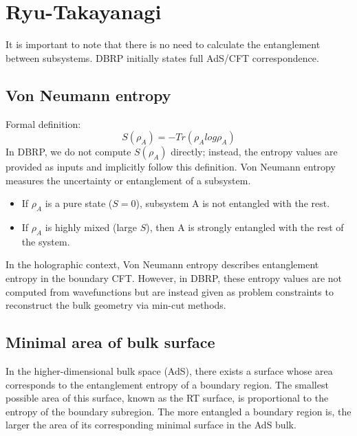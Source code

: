 \documentclass[12pt]{article}
\begin{document}
\section{Ryu-Takayanagi}
        \hspace{.5cm} It is important to note that there is no need to calculate the entanglement between subsystems. DBRP initially states full AdS/CFT correspondence.

    \subsection{Von Neumann entropy}
        Formal definition:
        \[
            S(\rho_A) = -Tr(\rho_{A}log\rho_A)
        \]
        \hspace{0.5cm} In DBRP, we do not compute $S(\rho_A)$ directly; instead, the entropy values are provided as inputs and implicitly follow this definition. Von Neumann entropy measures the uncertainty or entanglement of a subsystem.
        \begin{itemize}
            \item If $\rho_A$ is a pure state ($S=0$), subsystem A is not entangled with the rest.
            \item If $\rho_A$ is highly mixed (large $S$), then A is strongly entangled with the rest of the system.
        \end{itemize}

        In the holographic context, Von Neumann entropy describes entanglement entropy in the boundary CFT. However, in DBRP, these entropy values are not computed from wavefunctions but are instead given as problem constraints to reconstruct the bulk geometry via min-cut methods.
    
    \subsection{Minimal area of bulk surface}
        \hspace{0.5cm} In the higher-dimensional bulk space (AdS), there exists a surface whose area corresponds to the entanglement entropy of a boundary region. The smallest possible area of this surface, known as the RT surface, is proportional to the entropy of the boundary subregion. The more entangled a boundary region is, the larger the area of its corresponding minimal surface in the AdS bulk.        
\end{document}
